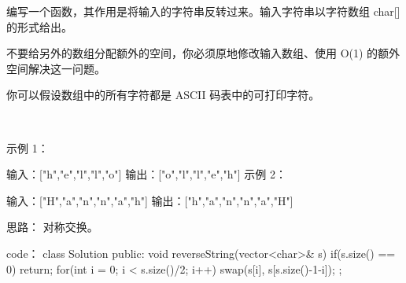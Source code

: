 编写一个函数，其作用是将输入的字符串反转过来。输入字符串以字符数组 char[] 的形式给出。

不要给另外的数组分配额外的空间，你必须原地修改输入数组、使用 O(1) 的额外空间解决这一问题。

你可以假设数组中的所有字符都是 ASCII 码表中的可打印字符。

 

示例 1：

输入：["h","e","l","l","o"]
输出：["o","l","l","e","h"]
示例 2：

输入：["H","a","n","n","a","h"]
输出：["h","a","n","n","a","H"]

















思路：
对称交换。























code：
class Solution {
public:
    void reverseString(vector<char>& s) {
        if(s.size() == 0) return;
        for(int i = 0; i < s.size()/2; i++)
        {
            swap(s[i], s[s.size()-1-i]);
        }
    }
};